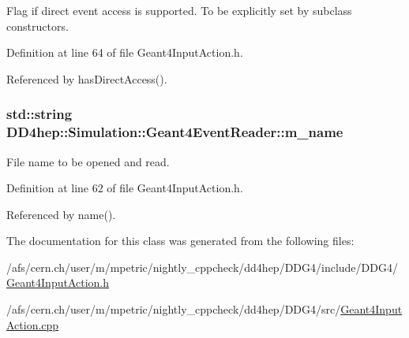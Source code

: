 Flag if direct event access is supported. To be explicitly set by subclass constructors. 

Definition at line 64 of file Geant4InputAction.h.

Referenced by hasDirectAccess().\hypertarget{class_d_d4hep_1_1_simulation_1_1_geant4_event_reader_a0a6ea787174ce598d22ce1616c1f25af}{
\subsubsection[{m\_\-name}]{\setlength{\rightskip}{0pt plus 5cm}std::string {\bf DD4hep::Simulation::Geant4EventReader::m\_\-name}}}
\label{class_d_d4hep_1_1_simulation_1_1_geant4_event_reader_a0a6ea787174ce598d22ce1616c1f25af}


File name to be opened and read. 

Definition at line 62 of file Geant4InputAction.h.

Referenced by name().

The documentation for this class was generated from the following files:\begin{DoxyCompactItemize}
\item 
/afs/cern.ch/user/m/mpetric/nightly\_\-cppcheck/dd4hep/DDG4/include/DDG4/\hyperlink{_geant4_input_action_8h}{Geant4InputAction.h}\item 
/afs/cern.ch/user/m/mpetric/nightly\_\-cppcheck/dd4hep/DDG4/src/\hyperlink{_geant4_input_action_8cpp}{Geant4InputAction.cpp}\end{DoxyCompactItemize}
